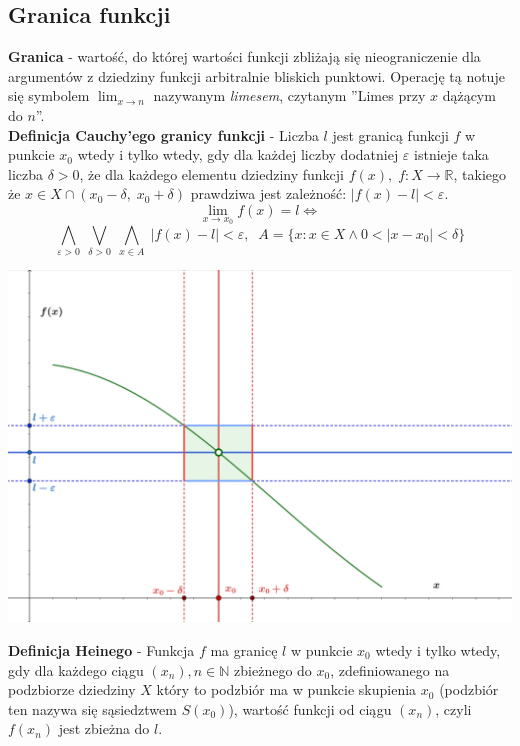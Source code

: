 \documentclass[14pt,a4paper]{extarticle}
\begin{document}
\subsection{Granica funkcji}
\noindent\textbf{Granica} - wartość, do której wartości funkcji zbliżają się nieograniczenie dla argumentów
z dziedziny funkcji arbitralnie bliskich punktowi. Operację tą notuje się symbolem $\displaystyle\lim_{x\to n}$ nazywanym \textit{limesem}, czytanym ''Limes przy $x$ dążącym do $n$''.\hfill\break\\

\noindent\textbf{Definicja Cauchy'ego granicy funkcji} - Liczba $l$ jest granicą funkcji $f$ w punkcie $x_{0}$ wtedy i tylko wtedy, gdy dla
każdej liczby dodatniej $\varepsilon$ istnieje taka liczba $\delta > 0$, że dla każdego elementu dziedziny funkcji $f(x), \; f: X \rightarrow \mathbb{R}$, takiego że
$x \in X \cap (x_{0} - \delta,\; x_{0} + \delta)$ prawdziwa jest zależność: $\vert f(x) - l\vert < \varepsilon$.\\
$$\lim_{x\to x_{0}} f(x) = l \Leftrightarrow $$
$$\underset{\varepsilon > 0}{\bigwedge} \;\underset{\delta > 0}{\bigvee} \; \underset{x \in A}{\bigwedge} \; \vert f(x) - l\vert < \varepsilon, \;\; A = \{x:x\in X \land 0 < \vert x - x_{0}\vert < \delta\}$$
\begin{center}
\includegraphics[scale=0.51]{limit funkcji.png}
\end{center}

\newpage
\noindent\textbf{Definicja Heinego} - Funkcja $f$ ma granicę $l$ w punkcie $x_{0}$ wtedy i tylko wtedy,
gdy dla każdego ciągu $(x_{n}), n \in \mathbb{N}$ zbieżnego do $x_{0}$, zdefiniowanego na podzbiorze dziedziny $X$ który
to podzbiór ma w punkcie skupienia $x_{0}$ (podzbiór ten nazywa się sąsiedztwem $S(x_{0})$), wartość funkcji od ciągu $(x_{n})$, czyli $f(x_{n})$ jest zbieżna do $l$.
\end{document}
